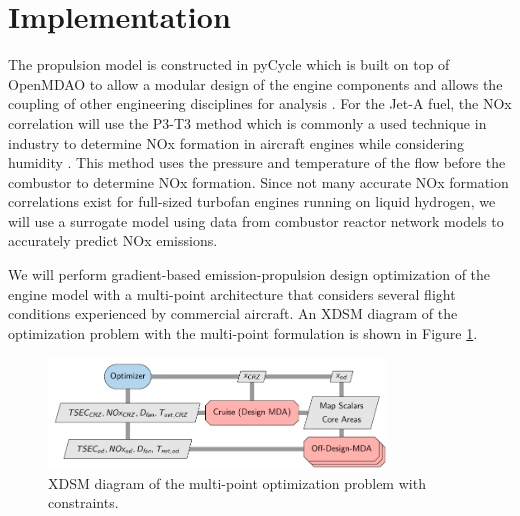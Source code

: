 \documentclass[conf]{new-aiaa}
\begin{document}
\section{Implementation}
\label{sec:imp}
The propulsion model is constructed in pyCycle which is built on top of OpenMDAO to allow a modular design of the engine components and allows the coupling of other engineering disciplines for analysis \cite{Gray2019a}.
For the Jet-A fuel, the NOx correlation will use the P3-T3 method which is commonly a used technique in industry to determine NOx formation in aircraft engines while considering humidity \cite{Dubois2006}.
This method uses the pressure and temperature of the flow before the combustor to determine NOx formation.
Since not many accurate NOx formation correlations exist for full-sized turbofan engines running on liquid hydrogen, we will use a surrogate model using data from combustor reactor network models to accurately predict NOx emissions.

We will perform gradient-based emission-propulsion design optimization of the engine model with a multi-point architecture that considers several flight conditions experienced by commercial aircraft.
An XDSM diagram of the optimization problem with the multi-point formulation is shown in Figure \ref{fig:opt_prob}.

\begin{figure}[H]
	\centering
	\includegraphics[width=0.8\textwidth]{N3_inject.pdf}
	\caption{XDSM diagram of the multi-point optimization problem with constraints.}
	\label{fig:opt_prob}
\end{figure}
\end{document}
